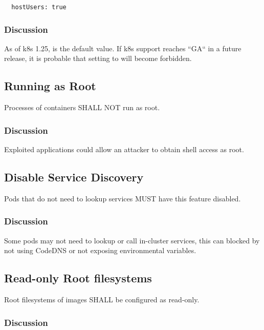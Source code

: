 \documentclass[PMO,authoryear,toc]{lsstdoc}
\begin{document}
\begin{verbatim}
  hostUsers: true
\end{verbatim}

\subsubsection{Discussion}

As of k8s 1.25,  is the default value.
If k8s  support reaches ``GA`` in a future release, it is probable that setting  to  will become forbidden.


\subsection{Running as Root}\label{sec:nonroot}

Processes of containers SHALL NOT run as root. 

\subsubsection{Discussion}

Exploited applications could allow an attacker to obtain shell access as root. 

\subsection{Disable Service Discovery}\label{sec:discovery}

Pods that do not need to lookup services MUST have this feature disabled. 

\subsubsection{Discussion}

Some pods may not need to lookup or call in-cluster services, this can blocked by not using CodeDNS or not exposing environmental variables. 

\subsection{Read-only Root filesystems}\label{sec:roroot}

Root filesystems of images SHALL be configured as read-only.

\subsubsection{Discussion}
\end{document}
